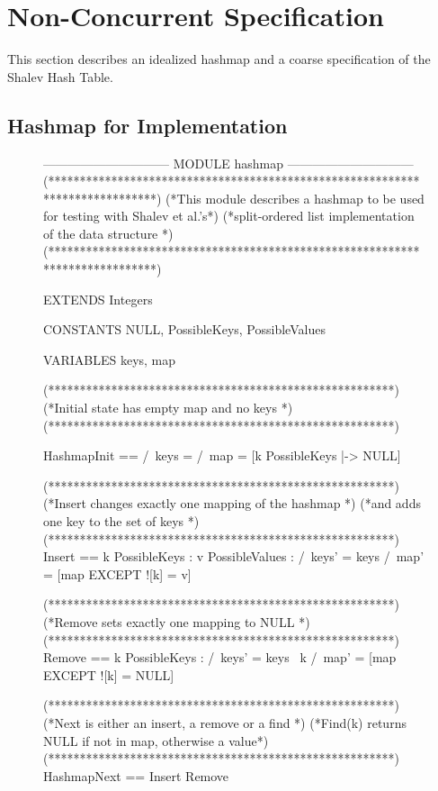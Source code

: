 \documentclass{uit-thesis}
\begin{document}
\section{Non-Concurrent Specification}
This section describes an idealized hashmap and a coarse specification of the Shalev Hash Table.
\subsection{Hashmap for Implementation}
\begin{figure}
    \begin{tla}
------------------------------ MODULE hashmap ------------------------------
(*****************************************************************************)
(*This module describes a hashmap to be used for testing with Shalev et al.'s*)
(*split-ordered list implementation of the data structure                    *)
(*****************************************************************************)

EXTENDS Integers

CONSTANTS NULL, PossibleKeys, PossibleValues

VARIABLES keys, map


(*******************************************************)
(*Initial state has empty map and no keys              *)
(*******************************************************)

HashmapInit ==  /\ keys = {}
                /\ map = [k \in PossibleKeys |-> NULL]

(*******************************************************)
(*Insert changes exactly one mapping of the hashmap    *)
(*and adds one key to the set of keys                  *)
(*******************************************************)
Insert ==   \exists k \in PossibleKeys :
                \exists v \in PossibleValues :
                    /\ keys' = keys 
                    /\ map' = [map EXCEPT ![k] = v]

(*******************************************************)
(*Remove sets exactly one mapping to NULL              *)
(*******************************************************)
Remove ==   \exists k \in PossibleKeys :
                /\ keys' = keys \ {k}
                /\ map' = [map EXCEPT ![k] = NULL]

(*******************************************************)
(*Next is either an insert, a remove or a find         *)
(*Find(k) returns NULL if not in map, otherwise a value*)
(*******************************************************)          
HashmapNext ==  \/ Insert
                \/ Remove



\end{tla}
\end{figure}
\end{document}
